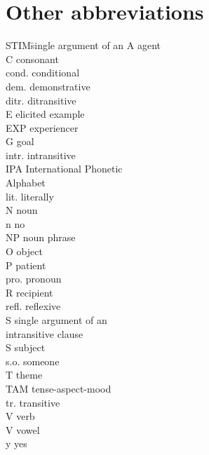 \section*{Other abbreviations}
	\begin{multicols}{2}
		\begin{tabbing}
		  STIM\hspace{\tabcolsep}\= single argument of an\kill
			A 		\>	{agent}\\
			C		\>  consonant\\
			cond.	\>	conditional\\
			dem.	\>	demonstrative\\
			ditr.	\>	ditransitive\\
			E	\>	elicited example\\
			EXP 	\>	{experiencer}\\
			G 		\>	{goal}\\
			intr. 	\>	intransitive\\
			IPA 	\>	International Phonetic\\
			{}		\>	Alphabet\\
			lit. 	\>	literally\\
			N 		\>	noun\\
			n		\>	no\\
			NP 		\>	{noun phrase}\\
			O		\>	object\\
			P 		\>	{patient}\\
			pro.		\>	pronoun\\
			R 		\>	{recipient}\\
			refl.		\>	reflexive\\
			S 		\>	single argument of an\\
			{}		\>	intransitive clause\\
			S		\>	subject\\
			s.o.		\>	someone\\
			T 		\>	{theme}\\
			TAM 	\>	tense-aspect-mood\\
			tr. 	\>	transitive\\
			V 		\>	verb\\
			V		\> 	vowel\\
			y		\> 	yes\\
		\end{tabbing}
	\end{multicols}
